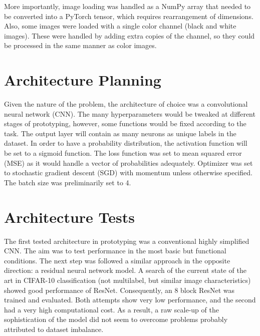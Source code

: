 \documentclass{article}
\begin{document}
More importantly, image loading was handled as a NumPy array that needed to be converted into a PyTorch tensor, which requires rearrangement of dimensions.
Also, some images were loaded with a single color channel (black and white images).
These were handled by adding extra copies of the channel, so they could be processed in the same manner as color images.


\section{Architecture Planning}
Given the nature of the problem, the architecture of choice was a convolutional neural network (CNN).
The many hyperparameters would be tweaked at different stages of prototyping, however, some functions would be fixed according to the task.
The output layer will contain as many neurons as unique labels in the dataset.
In order to have a probability distribution, the activation function will be set to a sigmoid function.
The loss function was set to mean squared error (MSE) as it would handle a vector of probabilities adequately.
Optimizer was set to stochastic gradient descent (SGD) with momentum unless otherwise specified.
The batch size was preliminarily set to 4.

\section{Architecture Tests}
The first tested architecture in prototyping was a conventional highly simplified CNN.
The aim was to test performance in the most basic but functional conditions.
The next step was followed a similar approach in the opposite direction: a residual neural network model.
A search of the current state of the art in CIFAR-10 classification (not multilabel, but similar image characteristics) showed good performance of ResNet.
Consequently, an 8 block ResNet was trained and evaluated.
Both attempts show very low performance, and the second had a very high computational cost.
As a result, a raw scale-up of the sophistication of the model did not seem to overcome problems probably attributed to dataset imbalance.
\end{document}
